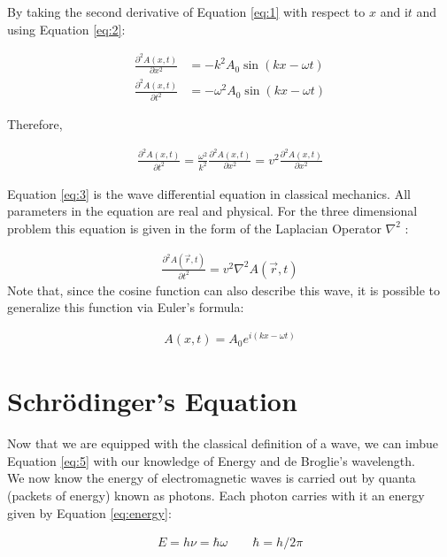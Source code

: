 By taking the second derivative of Equation \ref{eq:1} with respect to $x$ and
i$t$ and using Equation \ref{eq:2}: 

\begin{align*}
  \frac{\partial^2 A(x, t)}{\partial x^2} &= -k^2 A_0 \sin(kx - \omega t)\\
  \frac{\partial^2 A(x, t)}{\partial t^2} &= -\omega^2 A_0 \sin(kx - \omega t)
\end{align*}

Therefore, 

\begin{align} \label{eq:3}
  \frac{\partial^2 A(x, t)}{\partial t^2} = \frac{\omega^2}{k^2}
  \frac{\partial^2 A(x, t)}{\partial x^2} = v^2 \frac{\partial^2
  A(x,t)}{\partial x^2} 
\end{align} \vspace{5px}

Equation \ref{eq:3} is the wave differential equation in classical mechanics.
All parameters in the equation are real and physical. For the three dimensional
problem this equation is given in the form of the Laplacian Operator
$\nabla^2$ :

\begin{align} \label{eq:4}
  \frac{\partial^2 A(\vec{r}, t)}{\partial t^2} = v^2\nabla^2 A(\vec{r}, t)
\end{align}
Note that, since the cosine function can also describe this wave, it is
possible to generalize this function via Euler's formula: 

\begin{align} \label{eq:5}
  A(x, t) = A_0 e^{i(kx - \omega t)}
\end{align} \vspace{5px}

\section{Schr\"odinger's Equation}

Now that we are equipped with the classical definition of a wave, we can imbue
Equation \ref{eq:5} with our knowledge of Energy and de Broglie's wavelength.
\\

We now know the energy of electromagnetic waves is carried out by quanta
(packets of energy) known as photons. Each photon carries with it an energy
given by Equation \ref{eq:energy}: 

\begin{align} \label{eq:photonenergy}
  E = h\nu = \hbar \omega \qquad \hbar = h / 2\pi
\end{align} 

